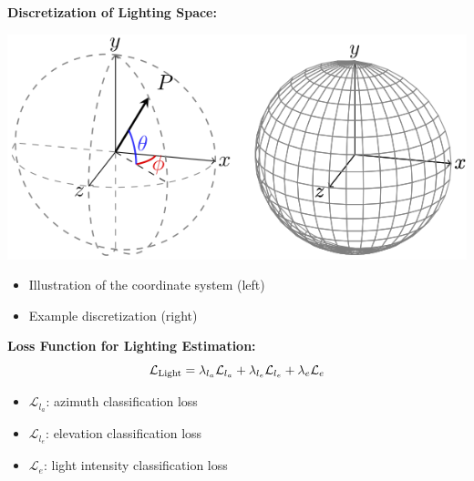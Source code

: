 \documentclass[landscape,a0paper,fontscale=0.292]{baposter}
\begin{document}
\begin{poster}
{    \begin{minipage}[t]{0.48\linewidth}
        \textbf{\color{blue}Discretization of Lighting Space:}
        \vspace{-0.2em}
        \begin{center}
            \includegraphics[width=\textwidth]{images/lighting_discretization.png}
        \end{center}
        \vspace{-0.7em}
        \begin{itemize}
            \item Illustration of the coordinate system (left)
            \item Example discretization (right)
        \end{itemize}
    \end{minipage}
    \hfill
    \begin{minipage}[t]{0.48\linewidth}
        \textbf{\color{blue}Loss Function for Lighting Estimation:}
        \vspace{-0.6em}
        \begin{equation*}
            \mathcal{L}_{\text{Light}} = \lambda_{l_a} \mathcal{L}_{l_a} + \lambda_{l_e} \mathcal{L}_{l_e} + \lambda_e \mathcal{L}_e
            \vspace{-0.6em}
        \end{equation*}
        \begin{itemize}
            \item $\mathcal{L}_{l_a}$: azimuth classification loss
            \item $\mathcal{L}_{l_e}$: elevation classification loss
            \item $\mathcal{L}_e$: light intensity classification loss
        \end{itemize}


\end{minipage}}
\end{poster}
\end{document}
